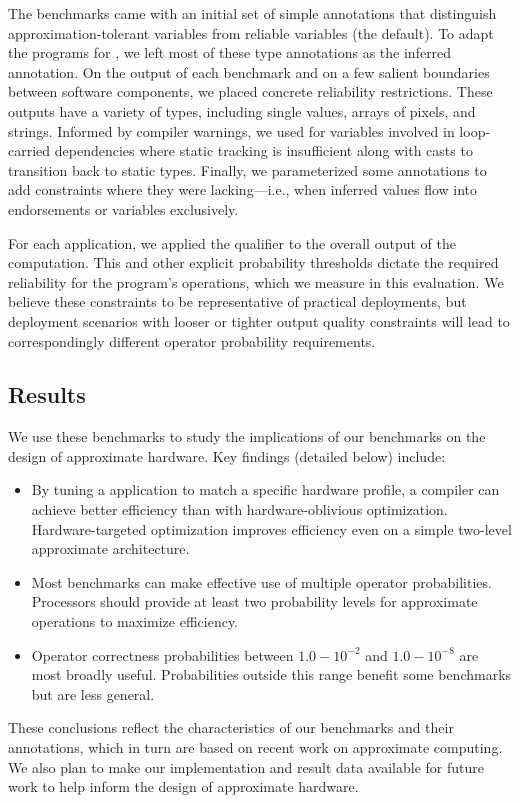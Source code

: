 The benchmarks came with an initial set of simple annotations that distinguish
approximation-tolerant variables from reliable variables (the default).
To adapt the programs for \lang, we left most of these type annotations as the
inferred  annotation.
On the output of each benchmark and on a few salient boundaries between software components, we placed concrete
 reliability restrictions.
These outputs have a variety of types, including single values, arrays of
pixels, and strings.
Informed by compiler warnings, we used  for variables
involved in loop-carried dependencies where static tracking is insufficient
along with  casts to transition back to static types.
Finally, we parameterized some  annotations to add constraints
where they were lacking---i.e., when inferred values flow into endorsements or
 variables exclusively.

For each application, we applied the  qualifier to the
overall output of the computation.
This and other explicit probability thresholds dictate the required reliability
for the program's operations, which we measure in this evaluation.
We believe these constraints to be representative of practical deployments,
but
deployment scenarios with looser or tighter output quality constraints will
lead to correspondingly different operator probability requirements.

\subsection{Results}

We use these benchmarks to study the implications of our benchmarks on the
design of approximate hardware.
Key findings (detailed below) include:
%
\begin{itemize}
\item By tuning a application to match a specific hardware profile, a compiler
    can achieve better efficiency than with hardware-oblivious optimization.
    Hardware-targeted optimization improves efficiency
    even on a simple two-level approximate architecture.
\item Most benchmarks can make effective use of multiple operator
    probabilities. Processors should provide at least two probability levels
    for approximate operations to maximize efficiency.
\item Operator correctness probabilities between $1.0 - 10^{-2}$ and $1.0 -
    10^{-8}$ are most broadly useful. Probabilities outside this range benefit
    some benchmarks but are less general.
\end{itemize}
%
These conclusions reflect the characteristics of our benchmarks and their
annotations, which in turn are based on recent work on approximate computing.
We also plan to make our implementation and result data available for future work to help
inform
the design of approximate hardware.

